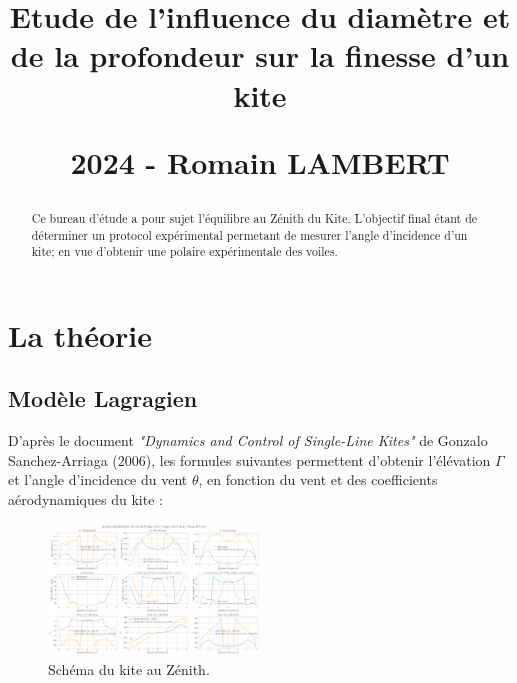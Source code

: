 \documentclass[conference]{IEEEtran}
\begin{document}
\title{\LARGE Etude de l'influence du diamètre et de la profondeur sur la finesse d'un kite
\vskip10pt

\small 2024 - Romain LAMBERT
}
\maketitle

\begin{abstract}Ce bureau d'étude a pour sujet l'équilibre au Zénith du Kite. L'objectif final étant de déterminer un protocol expérimental permetant de mesurer l'angle d'incidence d'un kite; en vue d'obtenir une polaire expérimentale des voiles. 
\end{abstract}
\IEEEoverridecommandlockouts

\IEEEpeerreviewmaketitle
\section{La théorie}

\subsection{Modèle Lagragien} 

D'après le document \textit{"Dynamics and Control of Single-Line Kites"} de Gonzalo Sanchez-Arriaga (2006),  les formules suivantes permettent d'obtenir l'élévation $\Gamma$ et l'angle d'incidence du vent $\theta$, en fonction du vent et des coefficients aérodynamiques du kite : \\

\begin{figure}[H]
    \centering
    \includegraphics[width=0.5\textwidth]{Pics/circulation BEYOND.png}  
    \caption{Schéma du kite au Zénith.}
    \label{fig:sanchez}
\end{figure}
\end{document}
